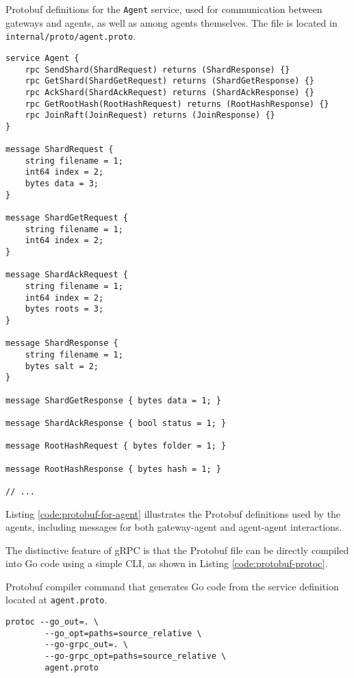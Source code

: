 \begin{listing}[H]
\caption{Protobuf definitions for the \texttt{Agent} service, used for communication between gateways and agents, as well as among agents themselves. The file is located in \texttt{internal/proto/agent.proto}.}
\label{code:protobuf-for-agent}
\begin{verbatim}
service Agent {
    rpc SendShard(ShardRequest) returns (ShardResponse) {}
    rpc GetShard(ShardGetRequest) returns (ShardGetResponse) {}
    rpc AckShard(ShardAckRequest) returns (ShardAckResponse) {}
    rpc GetRootHash(RootHashRequest) returns (RootHashResponse) {}
    rpc JoinRaft(JoinRequest) returns (JoinResponse) {}
}

message ShardRequest {
    string filename = 1;
    int64 index = 2;
    bytes data = 3;
}

message ShardGetRequest {
    string filename = 1;
    int64 index = 2;
}

message ShardAckRequest {
    string filename = 1;
    int64 index = 2;
    bytes roots = 3;
}

message ShardResponse {
    string filename = 1;
    bytes salt = 2;
}

message ShardGetResponse { bytes data = 1; }

message ShardAckResponse { bool status = 1; }

message RootHashRequest { bytes folder = 1; }

message RootHashResponse { bytes hash = 1; }

// ...
\end{verbatim}
\end{listing}

Listing \ref{code:protobuf-for-agent} illustrates the Protobuf definitions used by the agents, including messages for both gateway-agent and agent-agent interactions.

The distinctive feature of gRPC is that the Protobuf file can be directly compiled into Go code using a simple CLI, as shown in Listing \ref{code:protobuf-protoc}.

\begin{listing}
\caption{Protobuf compiler command that generates Go code from the service definition located at \texttt{agent.proto}.}
\label{code:protobuf-protoc}
\begin{verbatim}
protoc --go_out=. \
        --go_opt=paths=source_relative \
        --go-grpc_out=. \
        --go-grpc_opt=paths=source_relative \
        agent.proto
\end{verbatim}
\end{listing}

